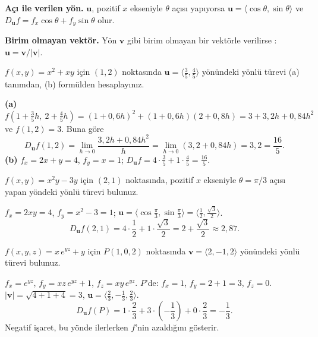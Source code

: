 \textbf{Açı ile verilen yön.} $\mathbf u$, pozitif $x$ ekseniyle $\theta$ açısı yapıyorsa $\mathbf u=\langle\cos\theta,\sin\theta\rangle$
ve $D_{\mathbf u}f=f_x\cos\theta+f_y\sin\theta$ olur.

\textbf{Birim olmayan vektör.} Yön $\mathbf v$ gibi birim olmayan bir vektörle verilirse : $\mathbf u=\mathbf v/|\mathbf v|$.

\begin{soru}
$f(x,y)=x^2+xy$ için $(1,2)$ noktasında $\mathbf u=\langle\frac35,\frac45\rangle$ yönündeki yönlü türevi (a) tanımdan,
(b) formülden hesaplayınız.
\end{soru}
\begin{cevap}
\textbf{(a)} $f(1+\tfrac35h,\ 2+\tfrac45h)=(1+0{,}6h)^2+(1+0{,}6h)(2+0{,}8h)=3+3{,}2h+0{,}84h^2$ ve $f(1,2)=3$. Buna göre
\[
D_{\mathbf u}f(1,2)=\lim_{h\to0}\frac{3{,}2h+0{,}84h^2}{h}=\lim_{h\to0}(3{,}2+0{,}84h)=3{,}2=\frac{16}{5}.
\]
\textbf{(b)} $f_x=2x+y=4$, $f_y=x=1$; $D_{\mathbf u}f=4\cdot\frac35+1\cdot\frac45=\frac{16}{5}$. \checkmark
\end{cevap}

\begin{soru}
$f(x,y)=x^2y-3y$ için $(2,1)$ noktasında, pozitif $x$ ekseniyle $\theta=\pi/3$ açısı yapan yöndeki yönlü türevi bulunuz.
\end{soru}
\begin{cevap}
$f_x=2xy=4$, $f_y=x^2-3=1$; $\mathbf u=\langle\cos\frac\pi3,\sin\frac\pi3\rangle=\langle\frac12,\frac{\sqrt3}{2}\rangle$.
\[
D_{\mathbf u}f(2,1)=4\cdot\frac12+1\cdot\frac{\sqrt3}{2}=\boxed{2+\frac{\sqrt3}{2}}\approx2{,}87 .
\]
\end{cevap}

\begin{soru}
$f(x,y,z)=x\,e^{yz}+y$ için $P(1,0,2)$ noktasında $\mathbf v=\langle2,-1,2\rangle$ yönündeki yönlü türevi bulunuz.
\end{soru}
\begin{cevap}
$f_x=e^{yz}$, $f_y=xz\,e^{yz}+1$, $f_z=xy\,e^{yz}$. $P$'de: $f_x=1$, $f_y=2+1=3$, $f_z=0$.
$|\mathbf v|=\sqrt{4+1+4}=3$, $\mathbf u=\langle\frac23,-\frac13,\frac23\rangle$.
\[
D_{\mathbf u}f(P)=1\cdot\frac23+3\cdot\left(-\frac13\right)+0\cdot\frac23=\boxed{-\frac13}.
\]
Negatif işaret, bu yönde ilerlerken $f$'nin azaldığını gösterir.
\end{cevap}

